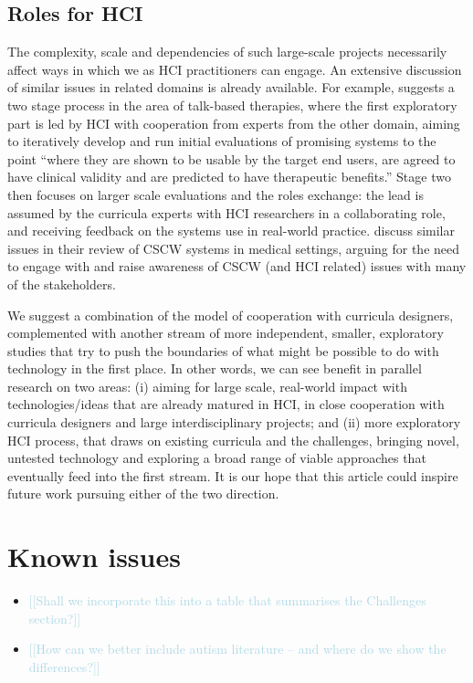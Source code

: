 \documentclass[prodmode,acmtochi]{acmsmall}
\newcommand{\todo}[1]{\textrm{\textrm{\textcolor{LightBlue}{[[#1]]} } } }
\begin{document}
\begin{itemize}
\subsection{Roles for HCI}
The complexity, scale and dependencies of such large-scale projects necessarily affect ways in which we as HCI practitioners can engage.  An extensive discussion of similar issues in related domains is already available. 
%
For example,  suggests a two stage process in the area of talk-based therapies, where the first exploratory part is led by HCI with cooperation from experts from the other domain, aiming to iteratively develop and run initial evaluations of promising systems to the point ``where they are shown to be usable by the target end users, are agreed to have clinical validity and are predicted to have therapeutic benefits.'' Stage two then focuses on larger scale evaluations and the roles exchange: the lead is assumed by the curricula experts with HCI researchers in a collaborating role, and receiving feedback on the systems use in real-world practice.
 discuss similar issues in their review of CSCW systems in medical settings, arguing for the need to engage with and raise awareness of CSCW (and HCI related) issues with many of the stakeholders. 

We suggest a combination of the  model of cooperation with curricula designers, complemented %
with another stream of more independent, smaller, exploratory studies that try to push the boundaries of what might be possible to do with technology in the first place.  In other words, we can see benefit in parallel research on two areas: (i) aiming for large scale, real-world impact with technologies/ideas that are already matured in HCI, in close cooperation with curricula designers and large interdisciplinary projects; and (ii) more exploratory HCI process, that draws on existing curricula and the challenges, bringing novel, untested technology and exploring a broad range of viable approaches that eventually feed into the first stream. It is our hope that this article could inspire future work pursuing either of the two direction. 


	
\end{itemize}


\section*{Known issues}
\begin{itemize}
	\item \todo{Shall we incorporate this into a table that summarises the Challenges section?}
	\item \todo{How can we better include autism literature -- and where do we show the differences?}
\end{itemize}
\end{document}
